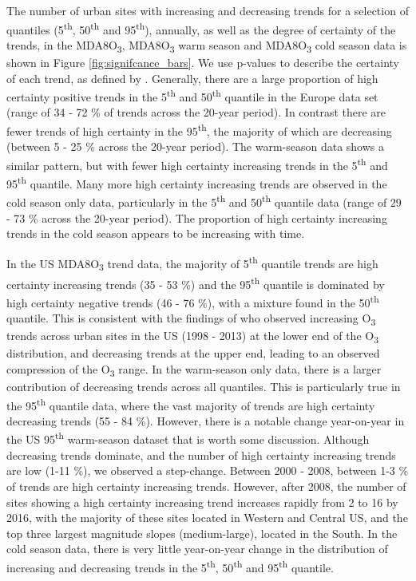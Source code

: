 \documentclass[journal abbreviation, manuscript]{copernicus}
\begin{document}
The number of urban sites with increasing and decreasing trends for a selection of quantiles (5\textsuperscript{th}, 50\textsuperscript{th} and 95\textsuperscript{th}), annually, as well as the degree of certainty of the trends, in the MDA8O\textsubscript{3}, MDA8O\textsubscript{3} warm season and MDA8O\textsubscript{3} cold season data is shown in Figure \ref{fig:signifcance_bars}. We use p-values to describe the certainty of each trend, as defined by \cite{chang2023guidancenotebeststatistical}.
Generally, there are a large proportion of high certainty positive trends in the 5\textsuperscript{th} and 50\textsuperscript{th} quantile in the Europe data set (range of 34 - 72 \% of trends across the 20-year period). In contrast there are fewer trends of high certainty in the 95\textsuperscript{th}, the majority of which are decreasing (between 5 - 25 \% across the 20-year period). The warm-season data shows a similar pattern, but with fewer high certainty increasing trends in the 5\textsuperscript{th} and 95\textsuperscript{th} quantile. Many more high certainty increasing trends are observed in the cold season only data, particularly in the 5\textsuperscript{th} and 50\textsuperscript{th} quantile data (range of 29 - 73 \% across the 20-year period). The proportion of high certainty increasing trends in the cold season appears to be increasing with time.

In the US MDA8O\textsubscript{3} trend data, the majority of 5\textsuperscript{th} quantile trends are high certainty increasing trends (35 - 53 \%) and the 95\textsuperscript{th} quantile is dominated by high certainty negative trends (46 - 76 \%), with a mixture found in the 50\textsuperscript{th} quantile. This is consistent with the findings of \cite{Simon_2015} who observed increasing O\textsubscript{3} trends across urban sites in the US (1998 - 2013) at the lower end of the O\textsubscript{3} distribution, and decreasing trends at the upper end, leading to an observed compression of the O\textsubscript{3} range. In the warm-season only data, there is a larger contribution of decreasing trends across all quantiles. This is particularly true in the 95\textsuperscript{th} quantile data, where the vast majority of trends are high certainty decreasing trends (55 - 84 \%). However, there is a notable change year-on-year in the US 95\textsuperscript{th} warm-season dataset that is worth some discussion. Although decreasing trends dominate, and the number of high certainty increasing trends are low (1-11 \%), we observed a step-change. Between 2000 - 2008, between 1-3 \% of trends are high certainty increasing trends. However, after 2008, the number of sites showing a high certainty increasing trend increases rapidly from 2 to 16 by 2016, with the majority of these sites located in Western and Central US, and the top three largest magnitude slopes (medium-large), located in the South. In the cold season data, there is very little year-on-year change in the distribution of increasing and decreasing trends in the 5\textsuperscript{th}, 50\textsuperscript{th} and 95\textsuperscript{th} quantile.
\end{document}

